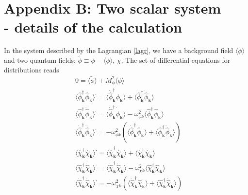\documentclass[twocolumn,showpacs,preprintnumbers,amsmath,amssymb,nofootinbib,superscriptaddress,prc]{revtex4}
\begin{document}
\section*{Appendix B: Two scalar system \\ - details of the calculation}

In the system described by the Lagrangian \ref{lagr}, we have a background field $\langle\phi\rangle$ and two quantum fields: $\tilde{\phi}\equiv\phi-\langle\phi\rangle$, $\chi$. The set of differential equations for distributions reads  
\begin{eqnarray}
 & 0  = \langle \ddot{\phi}\rangle+M_\phi^2\langle\phi\rangle\label{eq:eom_phi_2scalar}\\
& \langle \hat{\phi}_{\textbf{k}}^{\dagger} \hat{\phi}_{\textbf{k}} \rangle^{\cdot}
  = \langle \dot{\hat{\phi}}_{\textbf{k}}^{\dagger}\hat{\phi}_{\textbf{k}} \rangle + \langle \hat{\phi}_{\textbf{k}}^{\dagger} \dot{\hat{\phi}}_{\textbf{k}} \rangle \\
& \langle \hat{\phi}_{\textbf{k}}^{\dagger} \dot{\hat{\phi}}_{\textbf{k}} \rangle^{\cdot}
  = \langle \dot{\hat{\phi}}_{\textbf{k}}^{\dagger} \dot{\hat{\phi}}_{\textbf{k}} \rangle - \omega_{\phi k}^2 \langle \hat{\phi}_{\textbf{k}}^{\dagger} \hat{\phi}_{\textbf{k}} \rangle \\
& \langle \dot{\hat{\phi}}_{\textbf{k}}^{\dagger} \dot{\hat{\phi}}_{\textbf{k}} \rangle^{\cdot}
  = -\omega_{\phi k}^2(\langle \dot{\hat{\phi}}_{\textbf{k}}^{\dagger} \hat{\phi}_{\textbf{k}} \rangle + \langle \hat{\phi}_{\textbf{k}}^{\dagger}\dot{\hat{\phi}}_{\textbf{k}} \rangle)\\
& \langle \hat{\chi}_{\textbf{k}}^{\dagger} \hat{\chi}_{\textbf{k}} \rangle^{\cdot}
  = \langle \dot{\hat{\chi}}_{\textbf{k}}^{\dagger}\hat{\chi}_{\textbf{k}} \rangle + \langle \hat{\chi}_{\textbf{k}}^{\dagger} \dot{\hat{\chi}}_{\textbf{k}} \rangle \\
& \langle \hat{\chi}_{\textbf{k}}^{\dagger} \dot{\hat{\chi}}_{\textbf{k}} \rangle^{\cdot}
  = \langle \dot{\hat{\chi}}_{\textbf{k}}^{\dagger} \dot{\hat{\chi}}_{\textbf{k}} \rangle - \omega_{\chi k}^2 \langle \hat{\chi}_{\textbf{k}}^{\dagger} \hat{\chi}_{\textbf{k}} \rangle \\
& \langle \dot{\hat{\chi}}_{\textbf{k}}^{\dagger} \dot{\hat{\chi}}_{\textbf{k}} \rangle^{\cdot}
  = -\omega_{\chi k}^2(\langle \dot{\hat{\chi}}_{\textbf{k}}^{\dagger} \hat{\chi}_{\textbf{k}} \rangle + \langle \hat{\chi}_{\textbf{k}}^{\dagger}\dot{\hat{\chi}}_{\textbf{k}} \rangle)\label{eq:eom_dcdc_d_2scalar}
\end{eqnarray}
\end{document}
